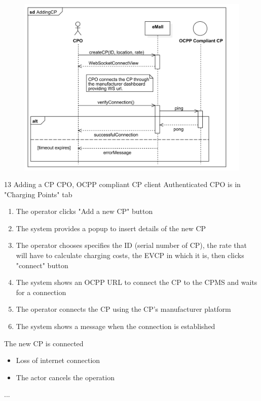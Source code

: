 \pagebreak
\usecase
{
    \begin{figure}[H]
        \centering
        \includegraphics[scale=0.9]{src/sequence_diagram/addingCP.png}
    \end{figure}
}
{13}
{Adding a CP} %
{CPO, OCPP compliant CP client} %
{Authenticated CPO is in "Charging Points" tab} %
{ %
    \begin{enumerate}
        \item The operator clicks "Add a new CP" button
        \item The system provides a popup to insert details of the new CP
        \item The operator chooses specifies the ID (serial number of CP), the rate that will have to calculate charging costs, the EVCP in which it is, then clicks "connect" button
        \item The system shows an OCPP URL to connect the CP to the CPMS and waits for a connection
        \item The operator connects the CP using the CP's manufacturer platform
        \item The system shows a message when the connection is established
    \end{enumerate}
}
{The new CP is connected} %
{ %
    \begin{itemize}
        \item Loss of internet connection
        \item The actor cancels the operation
    \end{itemize}
}
{ %
    ...
}

